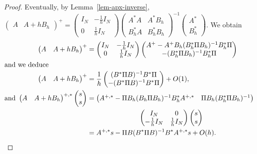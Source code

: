 \begin{proof}
 Eventually, by Lemma~\ref{lem-apx-inverse}, $\begin{pmatrix}
    A& A+hB_h
  \end{pmatrix}^+= \begin{pmatrix}I_N & -\frac{1}{h}I_N\\0 & \frac{1}{h}I_N\end{pmatrix}
  \begin{pmatrix} A^*A & A^*B_h\\B_h^*A & B_h^*B_h\end{pmatrix}^{-1}
\begin{pmatrix}A^*\\B_h^*\end{pmatrix}$.
We obtain 
\begin{align*}\begin{pmatrix}
    A& A+hB_h
  \end{pmatrix}^+&= \begin{pmatrix}I_N & -\frac{1}{h}I_N\\0 & \frac{1}{h}I_N\end{pmatrix}
\begin{pmatrix}
  A^+ -A^+B_h(B_h^*\Pi B_h)^{-1}B_h^*\Pi\\
  -(B_h^*\Pi B_h)^{-1}B_h^*\Pi
\end{pmatrix}\\
\intertext{and we deduce}
\begin{pmatrix}
    A& A+hB_h
  \end{pmatrix}^+&= \frac{1}{h}\begin{pmatrix}
  (B^*\Pi B)^{-1}B^*\Pi \\ -(B^*\Pi B)^{-1}B^*\Pi
\end{pmatrix}+O(1),\\
\mbox{and }
\begin{pmatrix}
    A& A+hB_h
  \end{pmatrix}^{+,*}\begin{pmatrix}
    s\\s
  \end{pmatrix}&= \begin{pmatrix}
    A^{+,*}-\Pi B_h(B_h\Pi B_h)^{-1}B_h^*A^{+,*} & \Pi B_h(B_h^*\Pi B_h)^{-1}
  \end{pmatrix}\\
&\qquad \qquad \qquad\begin{pmatrix}I_N &0 \\ -\frac{1}{h}I_N & \frac{1}{h}I_N\end{pmatrix}
\begin{pmatrix}s\\s\end{pmatrix}\\
&= A^{+,*}s -\Pi B(B^*\Pi B)^{-1}B^*A^{+,*}s + O(h).
\end{align*}
\end{proof}

